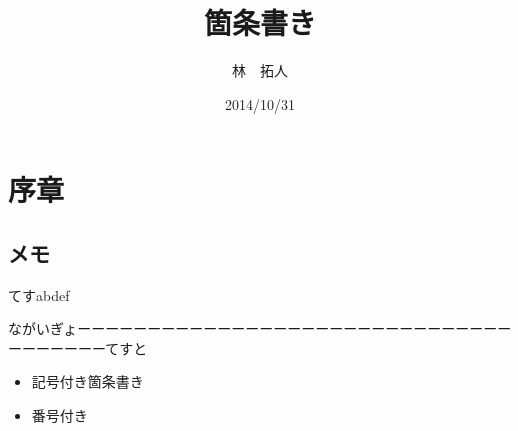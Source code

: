 \documentclass{jsarticle}
\begin{document}
\title{箇条書き}
\author{林　拓人}
\date{2014/10/31}
\maketitle

\section{序章}

\subsection{メモ}
てすabdef

ながいぎょーーーーーーーーーーーーーーーーーーーーーーーーーーーーーーーーーーーーーーてすと

\begin{itemize}
\item 記号付き箇条書き
\item 番号付き
\end{itemize}
\end{document}
